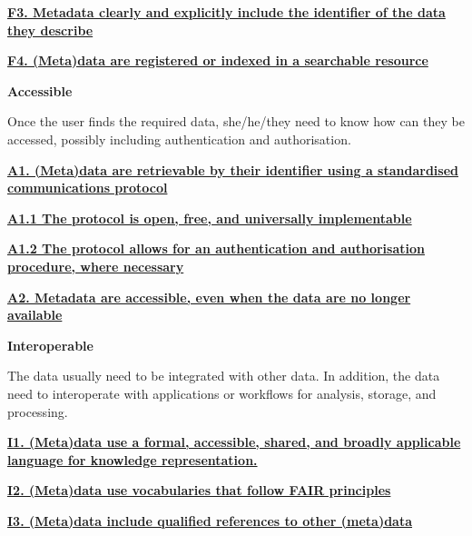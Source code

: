 \documentclass[
  a4paper,
  openany, a4paper, oneside]{book}
\begin{document}
\textbf{\href{https://www.go-fair.org/fair-principles/f3-metadata-clearly-explicitly-include-identifier-data-describe/}{F3. Metadata clearly and explicitly include the identifier of the data they describe}}

\textbf{\href{https://www.go-fair.org/fair-principles/f4-metadata-registered-indexed-searchable-resource/}{F4. (Meta)data are registered or indexed in a searchable resource}}

\textbf{{A}ccessible}

Once the user finds the required data, she/he/they need to know how can they be accessed, possibly including authentication and authorisation.

\textbf{\href{https://www.go-fair.org/fair-principles/542-2/}{A1. (Meta)data are retrievable by their identifier using a standardised communications protocol}}

\textbf{\href{https://www.go-fair.org/fair-principles/a1-1-protocol-open-free-universally-implementable/}{A1.1 The protocol is open, free, and universally implementable}}

\textbf{\href{https://www.go-fair.org/fair-principles/a1-2-protocol-allows-authentication-authorisation-required/}{A1.2 The protocol allows for an authentication and authorisation procedure, where necessary}}

\textbf{\href{https://www.go-fair.org/fair-principles/a2-metadata-accessible-even-data-no-longer-available/}{A2. Metadata are accessible, even when the data are no longer available}}

\textbf{{I}nteroperable}

The data usually need to be integrated with other data. In addition, the data need to interoperate with applications or workflows for analysis, storage, and processing.

\textbf{\href{https://www.go-fair.org/fair-principles/i1-metadata-use-formal-accessible-shared-broadly-applicable-language-knowledge-representation/}{I1. (Meta)data use a formal, accessible, shared, and broadly applicable language for knowledge representation.}}

\textbf{\href{https://www.go-fair.org/fair-principles/i2-metadata-use-vocabularies-follow-fair-principles/}{I2. (Meta)data use vocabularies that follow FAIR principles}}

\textbf{\href{https://www.go-fair.org/fair-principles/i3-metadata-include-qualified-references-metadata/}{I3. (Meta)data include qualified references to other (meta)data}}
\end{document}
